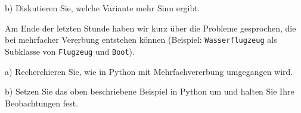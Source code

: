\documentclass[11pt, a4paper, oneside]{article}
\begin{document}
	b) Diskutieren Sie, welche Variante mehr Sinn ergibt.
	
	\pagebreak
	
	
	Am Ende der letzten Stunde haben wir kurz über die Probleme gesprochen, die bei mehrfacher Vererbung entstehen können (Beispiel: \texttt{Wasserflugzeug} als Subklasse von \texttt{Flugzeug} und \texttt{Boot}).
	
	a) Recherchieren Sie, wie in Python mit Mehrfachvererbung umgegangen wird.
		
	\lines[3cm]
		
	b) Setzen Sie das oben beschriebene Beispiel in Python um und halten Sie Ihre Beobachtungen fest.
		
	\lines[3cm]
	
\end{document}
